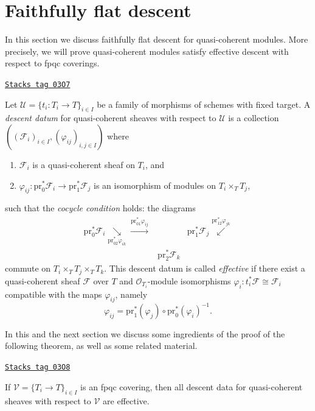 \section{Faithfully flat descent}
\label{etale-cohomology-section-fpqc-descent}
In this section we discuss faithfully flat descent for quasi-coherent
modules. More precisely, we will prove quasi-coherent modules satisfy
effective descent with respect to fpqc coverings.

\begin{definition}
\label{etale-cohomology-definition-descent-datum}
\href{https://stacks.math.columbia.edu/tag/03O7}{\texttt{Stacks tag 03O7}}

Let $\mathcal{U} = \{ t_i : T_i \to T\}_{i \in I}$ be a family of
morphisms of schemes with fixed target. A {\it descent datum} for
quasi-coherent sheaves with respect to $\mathcal{U}$ is a collection
$((\mathcal{F}_i)_{i \in I}, (\varphi_{ij})_{i, j \in I})$ where
\begin{enumerate}
\item $\mathcal{F}_i$ is a quasi-coherent sheaf on $T_i$, and
\item $\varphi_{ij} : \text{pr}_0^* \mathcal{F}_i \to
\text{pr}_1^* \mathcal{F}_j$ is an isomorphism of modules
on $T_i \times_T T_j$,
\end{enumerate}
such that the {\it cocycle condition} holds: the diagrams
$$
\begin{array}{ccc}\text{pr}_0^*\mathcal{F}_i \underset{\text{pr}_{02}^*\varphi_{ik}}{\searrow}\overset{\text{pr}_{01}^*\varphi_{ij}}{\longrightarrow} &  & \text{pr}_1^*\mathcal{F}_j \overset{\text{pr}_{12}^*\varphi_{jk}}{\swarrow} \\  & \text{pr}_2^*\mathcal{F}_k & \end{array}
$$
commute on $T_i \times_T T_j \times_T T_k$.
This descent datum is called {\it effective} if there exist a quasi-coherent
sheaf $\mathcal{F}$ over $T$ and $\mathcal{O}_{T_i}$-module isomorphisms
$\varphi_i : t_i^* \mathcal{F} \cong \mathcal{F}_i$ compatible with
the maps $\varphi_{ij}$, namely
$$
\varphi_{ij} = \text{pr}_1^* (\varphi_j) \circ \text{pr}_0^* (\varphi_i)^{-1}.
$$
\end{definition}

In this and the next section we discuss some ingredients of the proof
of the following theorem, as well as some related material.

\begin{theorem}
\label{etale-cohomology-theorem-descent-quasi-coherent}
\href{https://stacks.math.columbia.edu/tag/03O8}{\texttt{Stacks tag 03O8}}

If $\mathcal{V} = \{T_i \to T\}_{i\in I}$ is an fpqc covering, then all
descent data for quasi-coherent sheaves with respect to $\mathcal{V}$
are effective.
\end{theorem}

